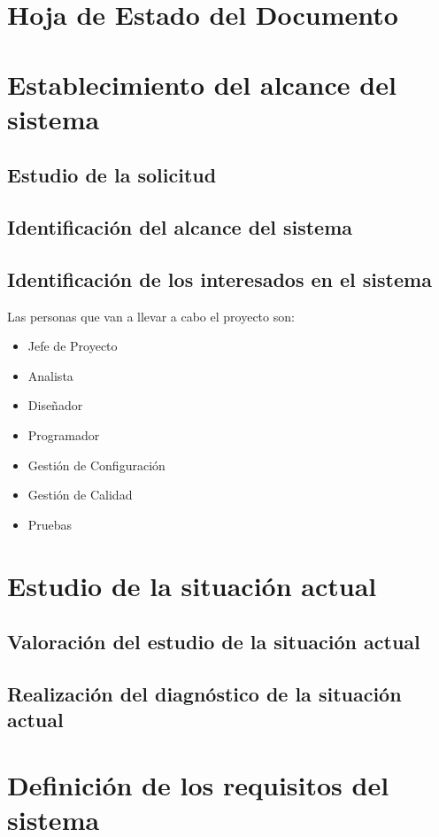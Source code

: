 \documentclass[10pt,a4paper,oldfontcommands]{dpds}
\begin{document}
\pagecolor{fondo}
\color{principal}


\section*{Hoja de Estado del Documento}

\section{Establecimiento del alcance del sistema}
\subsection{Estudio de la solicitud}
\subsection{Identificación del alcance del sistema}
\subsection{Identificación de los interesados en el sistema}
\par Las personas que van a llevar a cabo el proyecto son:
\begin{itemize}[-]
\item Jefe de Proyecto
\item Analista
\item Diseñador
\item Programador
\item Gestión de Configuración
\item Gestión de Calidad
\item Pruebas
\end{itemize}

\section{Estudio de la situación actual}
\subsection{Valoración del estudio de la situación actual}
\subsection{Realización del diagnóstico de la situación actual}


\section{Definición de los requisitos del sistema}
\end{document}
